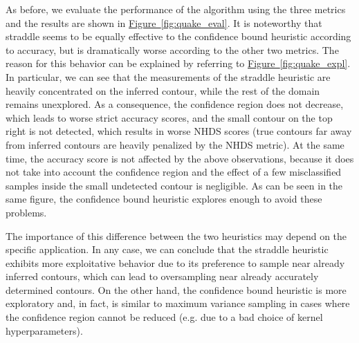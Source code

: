 \documentclass[11pt]{article} %
\newcommand{\figref}[1]{\hyperref[#1]{\mbox{Figure~\ref*{#1}}}}
\begin{document}
As before, we evaluate the performance of the algorithm using the three metrics
and the results are shown in \figref{fig:quake_eval}. It is noteworthy that
straddle seems to be equally effective to the confidence bound heuristic
according to accuracy, but is dramatically worse according to the other two
metrics. The reason for this behavior can be explained by referring to
\figref{fig:quake_expl}. In particular, we can see that the measurements of
the straddle heuristic are heavily concentrated on the inferred contour, while
the rest of the domain remains unexplored. As a consequence, the confidence region
does not decrease, which leads to worse strict accuracy scores, and the small
contour on the top right is not detected, which results in worse NHDS scores
(true contours far away from inferred contours are heavily penalized by the
NHDS metric). At the same time, the accuracy score is not affected by the
above observations, because it does not take into account the confidence
region and the effect of a few misclassified samples inside the small
undetected contour is negligible. As can be seen in the same figure,
the confidence bound heuristic explores enough to avoid these problems.

The importance of this difference between the two heuristics may depend on
the specific application. In any
case, we can conclude that the straddle heuristic exhibits more exploitative
behavior due to its preference to sample near already inferred contours, which
can lead to oversampling near already accurately determined contours. On the
other hand, the confidence bound heuristic is more exploratory and, in fact, is
similar to maximum variance sampling in cases where the confidence region
cannot be reduced (e.g. due to a bad choice of kernel hyperparameters).
\end{document}
